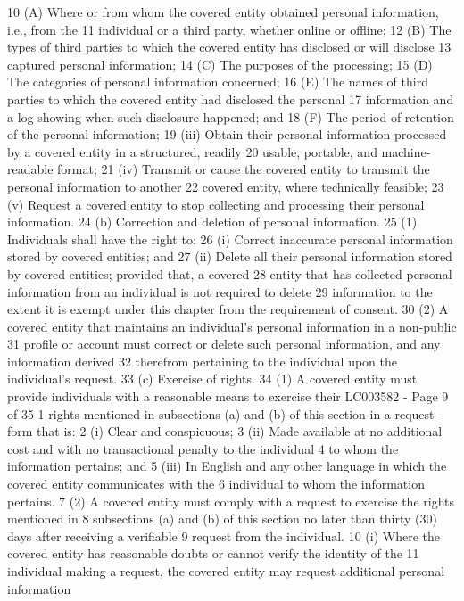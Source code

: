 10 (A) Where or from whom the covered entity obtained personal information, i.e., from the
11 individual or a third party, whether online or offline;
12 (B) The types of third parties to which the covered entity has disclosed or will disclose
13 captured personal information;
14 (C) The purposes of the processing;
15 (D) The categories of personal information concerned;
16 (E) The names of third parties to which the covered entity had disclosed the personal
17 information and a log showing when such disclosure happened; and
18 (F) The period of retention of the personal information;
19 (iii) Obtain their personal information processed by a covered entity in a structured, readily
20 usable, portable, and machine-readable format;
21 (iv) Transmit or cause the covered entity to transmit the personal information to another
22 covered entity, where technically feasible;
23 (v) Request a covered entity to stop collecting and processing their personal information.
24 (b) Correction and deletion of personal information.
25 (1) Individuals shall have the right to:
26 (i) Correct inaccurate personal information stored by covered entities; and
27 (ii) Delete all their personal information stored by covered entities; provided that, a covered
28 entity that has collected personal information from an individual is not required to delete
29 information to the extent it is exempt under this chapter from the requirement of consent.
30 (2) A covered entity that maintains an individual's personal information in a non-public
31 profile or account must correct or delete such personal information, and any information derived
32 therefrom pertaining to the individual upon the individual's request.
33 (c) Exercise of rights.
34 (1) A covered entity must provide individuals with a reasonable means to exercise their 
LC003582 - Page 9 of 35
1 rights mentioned in subsections (a) and (b) of this section in a request-form that is:
2 (i) Clear and conspicuous;
3 (ii) Made available at no additional cost and with no transactional penalty to the individual
4 to whom the information pertains; and
5 (iii) In English and any other language in which the covered entity communicates with the
6 individual to whom the information pertains.
7 (2) A covered entity must comply with a request to exercise the rights mentioned in
8 subsections (a) and (b) of this section no later than thirty (30) days after receiving a verifiable
9 request from the individual.
10 (i) Where the covered entity has reasonable doubts or cannot verify the identity of the
11 individual making a request, the covered entity may request additional personal information
